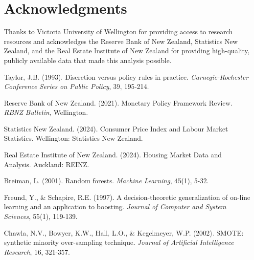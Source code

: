 \documentclass[11pt,a4paper]{article}
\begin{document}
	\section*{Acknowledgments}
	Thanks to Victoria University of Wellington for providing access to research resources and acknowledges the Reserve Bank of New Zealand, Statistics New Zealand, and the Real Estate Institute of New Zealand for providing high-quality, publicly available data that made this analysis possible.
	
	
	\begin{thebibliography}{9}
		
		Taylor, J.B. (1993). Discretion versus policy rules in practice. \textit{Carnegie-Rochester Conference Series on Public Policy}, 39, 195-214.
		
		Reserve Bank of New Zealand. (2021). Monetary Policy Framework Review. \textit{RBNZ Bulletin}, Wellington.
		
		Statistics New Zealand. (2024). Consumer Price Index and Labour Market Statistics. Wellington: Statistics New Zealand.
		
		Real Estate Institute of New Zealand. (2024). Housing Market Data and Analysis. Auckland: REINZ.
		
		Breiman, L. (2001). Random forests. \textit{Machine Learning}, 45(1), 5-32.
		
		Freund, Y., \& Schapire, R.E. (1997). A decision-theoretic generalization of on-line learning and an application to boosting. \textit{Journal of Computer and System Sciences}, 55(1), 119-139.
		
		Chawla, N.V., Bowyer, K.W., Hall, L.O., \& Kegelmeyer, W.P. (2002). SMOTE: synthetic minority over-sampling technique. \textit{Journal of Artificial Intelligence Research}, 16, 321-357.
		
	\end{thebibliography}
	
\end{document}
